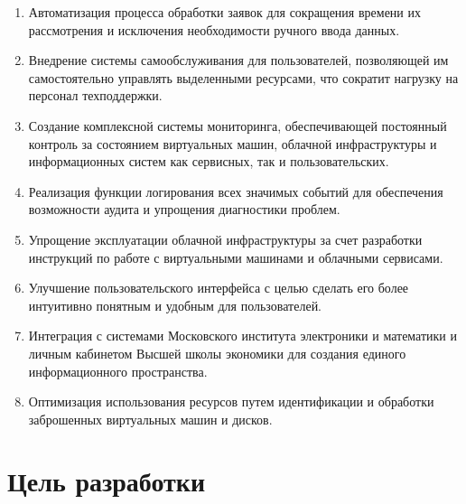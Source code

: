 \documentclass[14pt, a4paper]{extarticle}
\begin{document}
\begin{enumerate}
\item Автоматизация процесса обработки заявок для сокращения времени их рассмотрения и исключения необходимости ручного ввода данных.
\item Внедрение системы самообслуживания для пользователей, позволяющей им самостоятельно управлять выделенными ресурсами, что сократит нагрузку на персонал техподдержки.
\item Создание комплексной системы мониторинга, обеспечивающей постоянный контроль за состоянием виртуальных машин, облачной инфраструктуры и информационных систем как сервисных, так и пользовательских.
\item Реализация функции логирования всех значимых событий для обеспечения возможности аудита и упрощения диагностики проблем.
\item Упрощение эксплуатации облачной инфраструктуры за счет разработки инструкций по работе с виртуальными машинами и облачными сервисами.
\item Улучшение пользовательского интерфейса с целью сделать его более интуитивно понятным и удобным для пользователей.
\item Интеграция с системами Московского института электроники и математики и личным кабинетом Высшей школы экономики для создания единого информационного пространства.
\item Оптимизация использования ресурсов путем идентификации и обработки заброшенных виртуальных машин и дисков.
\end{enumerate}

\section{Цель разработки}
\end{document}
